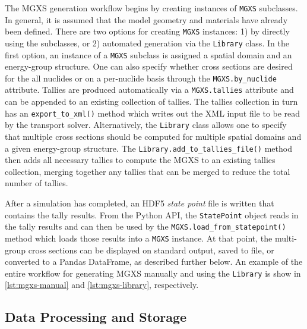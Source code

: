 The MGXS generation workflow begins by creating instances of \texttt{MGXS} subclasses. In general, it is assumed that the model geometry and materials have already been defined. There are two options for creating \texttt{MGXS} instances: 1) by directly using the subclasses, or 2) automated generation via the \texttt{Library} class. In the first option, an instance of a \texttt{MGXS} subclass is assigned a spatial domain and an energy-group structure. One can also specify whether cross sections are desired for the all nuclides or on a per-nuclide basis through the \texttt{MGXS.by_nuclide} attribute. Tallies are produced automatically via a \texttt{MGXS.tallies} attribute and can be appended to an existing collection of tallies. The tallies collection in turn has an \texttt{export_to_xml()} method which writes out the XML input file to be read by the transport solver. Alternatively, the \texttt{Library} class allows one to specify that multiple cross sections should be computed for multiple spatial domains and a given energy-group structure. The \texttt{Library.add_to_tallies_file()} method then adds all necessary tallies to compute the MGXS to an existing tallies collection, merging together any tallies that can be merged to reduce the total number of tallies.

After a simulation has completed, an HDF5 \emph{state point} file is written
that contains the tally results. From the Python API, the \texttt{StatePoint}
object reads in the tally results and can then be used by the
\texttt{MGXS.load_from_statepoint()} method which loads those results into a
\texttt{MGXS} instance. At that point, the multi-group cross sections can be displayed on standard output, saved to file, or converted to a Pandas DataFrame, as described further below. An example of the entire workflow for generating MGXS manually and using the \texttt{Library} is show in \cref{lst:mgxs-manual} and \cref{lst:mgxs-library}, respectively.






\subsection{Data Processing and Storage}
\label{subsec:data-processing}


